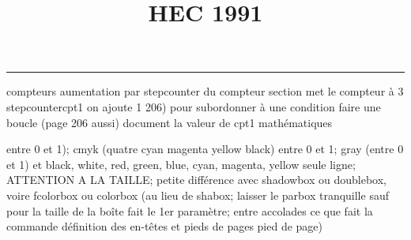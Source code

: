 \documentclass[11pt]{article}%
\title{\bf \vspace{-1cm} HEC 1991} %
\author{} %
\date{} %
\renewcommand{\headrulewidth}{0pt}%
\renewcommand{\footrulewidth}{0.4pt}%
\begin{document}
\maketitle %
\vspace{-1.2cm}\hrule %
\thispagestyle{fancy}

\vspace*{.4cm}


compteurs%
aumentation par stepcounter du compteur section%
met le compteur à 3%
stepcounter{cpt1} on ajoute 1%
206) pour subordonner à une condition %
faire une boucle (page 206 aussi) %
document la valeur de cpt1 
mathématiques\newcommand{\ch}{\operatorname{ch}} 
\newcommand{\sh}{\operatorname{sh}}
\renewcommand{\tanh}{\operatorname{th}}
\renewcommand{\sinh}{\operatorname{sh}}
\renewcommand{\cosh}{\operatorname{ch}}
\newcommand{\argsh}{\operatorname{argsh}}
\newcommand{\argch}{\operatorname{argch}}
\newcommand{\argth}{\operatorname{argth}}
\newcommand{\Id}{\operatorname{Id}}
\renewcommand{\leq}{\leq}
\renewcommand{\geq}{\geq }

\newcommand{\dlim}{\lim}
\newcommand{\dsum}{\sum}
\newcommand{\dprod}{\prod}



entre 0 et 1); cmyk (quatre cyan magenta yellow black) entre 0 et 1;
gray (entre 0 et 1) et black, white, red, green, blue, cyan, magenta,
yellow%
seule ligne; ATTENTION A LA TAILLE; petite différence avec shadowbox ou
doublebox, voire fcolorbox ou colorbox (au lieu de shabox; laisser le
parbox tranquille sauf pour la taille de la boîte
\newcommand{\Tbox}[1]{\begin{center} \shabox{\parbox{0.6
\linewidth}{#1}} \end{center}} %
fait le 1er paramètre; entre accolades ce que fait la commande
définition des en-têtes et pieds de pages\pagestyle{fancy}
\chead{}
\rfoot[ \ \thepage]{\thepage}
\cfoot{}
\lfoot{}
\thispagestyle{fancy} %
pied de page)\renewcommand{\footrulewidth}{0.4pt}
\renewcommand{\headrulewidth}{0.4pt}
\end{document}
